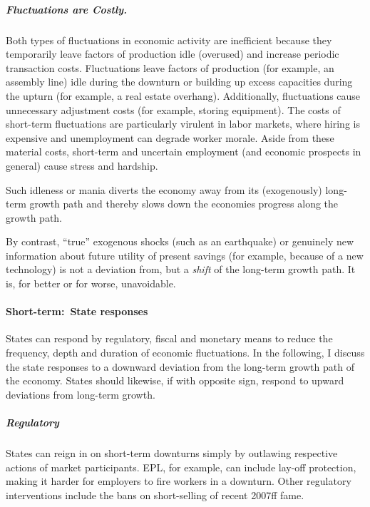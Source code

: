 \subparagraph{Fluctuations are Costly.}
Both types of fluctuations in economic activity are inefficient because they temporarily leave factors of production idle (overused) and increase periodic transaction costs.
Fluctuations leave factors of production (for example, an assembly line) idle during the downturn or building up excess capacities during the upturn (for example, a real estate overhang).
Additionally, fluctuations cause unnecessary adjustment costs (for example, storing equipment).
The costs of short-term fluctuations are particularly virulent in labor markets, where hiring is expensive and unemployment can degrade worker morale.
Aside from these material costs, short-term and uncertain employment (and economic prospects in general) cause stress and hardship.

Such idleness or mania diverts the economy away from its (exogenously) long-term growth path and thereby slows down the economies progress along the growth path.

By contrast, ``true'' exogenous shocks (such as an earthquake) or genuinely new information about future utility of present savings (for example, because of a new technology) is not a deviation from, but a \emph{shift} of the long-term growth path.
It is, for better or for worse, unavoidable.

\paragraph{Short-term:~State responses}
States can respond by regulatory, fiscal and monetary means to reduce the frequency, depth and duration of economic fluctuations.
In the following, I discuss the state responses to a downward deviation from the long-term growth path of the economy.
States should likewise, if with opposite sign, respond to upward deviations from long-term growth.

\subparagraph{Regulatory}
States can reign in on short-term downturns simply by outlawing respective actions of market participants.
\gls{EPL}, for example, can include lay-off protection, making it harder for employers to fire workers in a downturn.
Other regulatory interventions include the bans on short-selling of recent 2007ff fame.

